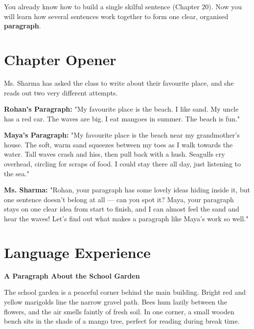 \begin{rememberbox}
You already know how to build a single skilful sentence (Chapter 20). Now you will learn how several sentences work together to form one clear, organised \textbf{paragraph}.
\end{rememberbox}

\section{Chapter Opener}
Ms. Sharma has asked the class to write about their favourite place, and she reads out two very different attempts.

\textbf{Rohan's Paragraph:} "My favourite place is the beach. I like sand. My uncle has a red car. The waves are big. I eat mangoes in summer. The beach is fun."

\textbf{Maya's Paragraph:} "My favourite place is the beach near my grandmother's house. The soft, warm sand squeezes between my toes as I walk towards the water. Tall waves crash and hiss, then pull back with a hush. Seagulls cry overhead, circling for scraps of food. I could stay there all day, just listening to the sea."

\textbf{Ms. Sharma:} "Rohan, your paragraph has some lovely ideas hiding inside it, but one sentence doesn't belong at all — can you spot it? Maya, your paragraph stays on one clear idea from start to finish, and I can almost feel the sand and hear the waves! Let's find out what makes a paragraph like Maya's work so well."

\section{Language Experience}
\textbf{A Paragraph About the School Garden}

\begin{tcolorbox}[colback=gray!5, colframe=gray!50, sharp corners, boxsep=0pt, left=5pt, right=5pt, top=5pt, bottom=5pt, breakable]
The school garden is a peaceful corner behind the main building. Bright red and yellow marigolds line the narrow gravel path. Bees hum lazily between the flowers, and the air smells faintly of fresh soil. In one corner, a small wooden bench sits in the shade of a mango tree, perfect for reading during break time.
\end{tcolorbox}


